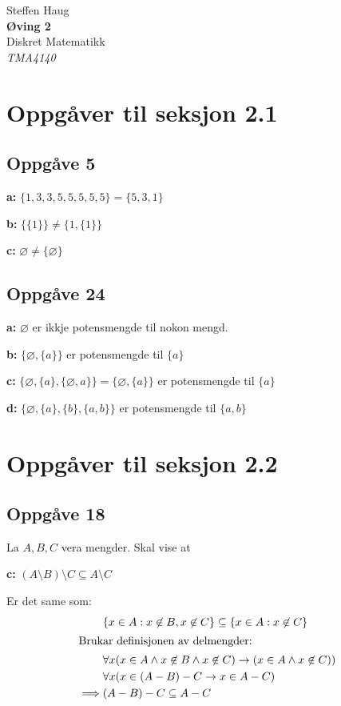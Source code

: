 \documentclass[a4paper, 11pt]{article}
\author{\forfatter}
\date{}
\newcommand{\tittel}{Øving 2}
\newcommand{\fag}{Diskret Matematikk}
\newcommand{\fagkode}{TMA4140}
\newcommand{\forfatter}{Steffen Haug}
\newcommand{\deloppg}[1]{\vspace{1mm}\noindent \textbf{\themecolor{#1:}}}
\newcommand{\themeshade}{Mahogany}
\newcommand{\themecolor}[1]{\textcolor{\themeshade}{#1}}
\newcommand*{\titleTH}{\begingroup %
\raggedleft %
\vspace*{\baselineskip} %

{\Large \forfatter}\\[0.167\textheight] %

{\LARGE\bfseries \tittel}\\[\baselineskip] %

{\themecolor{\Huge \fag}}\\[\baselineskip] %

{\Large \textit{\fagkode}}\par %

\vfill %
\endgroup}
\begin{document}
\pagestyle{empty}
\titleTH\newpage

\section{Oppgåver til seksjon 2.1} %
\subsection*{Oppgåve 5}

\deloppg{a} \( \{ 1,3,3,5,5,5,5,5 \} = \{5,3,1\}\)

\deloppg{b} \( \{\{1\}\} \neq \{1, \{1\}\} \)

\deloppg{c} \( \varnothing \neq \{\varnothing\} \)

\subsection*{Oppgåve 24}
\deloppg{a} \( \varnothing \) er ikkje potensmengde til nokon mengd.

\deloppg{b} \( \{\varnothing, \{a\} \} \) er potensmengde til \( \{a\} \)

\deloppg{c} \( \{ \varnothing, \{a\}, \{\varnothing, a\} \} 
= \{\varnothing,\{a\}\} \) er potensmengde til \(\{a\}\)

\deloppg{d} \( \{\varnothing, \{a\}, \{b\}, \{a,b\}\} \) er potensmengde til \(\{a,b\}\)


\section{Oppgåver til seksjon 2.2}

\subsection{Oppgåve 18}
\noindent La \(A,B,C\) vera mengder. Skal vise at

\deloppg{c} \( (A \setminus B) \setminus C \subseteq A \setminus C \)

\noindent Er det same som:
\begin{align*}
    &\{x \in A : x \not\in B, x \not\in C\} \subseteq \{x \in A : x \not\in C\} \\
    \intertext{Brukar definisjonen av delmengder:}
    &\forall x (x \in A \land x\not\in B \land x\not\in C) \rightarrow (x \in A \land x \not\in C))\\
    &\forall x (x \in (A - B) - C \rightarrow x \in A - C) \\
    \implies &(A - B) - C \subseteq A - C
\end{align*}
\end{document}
